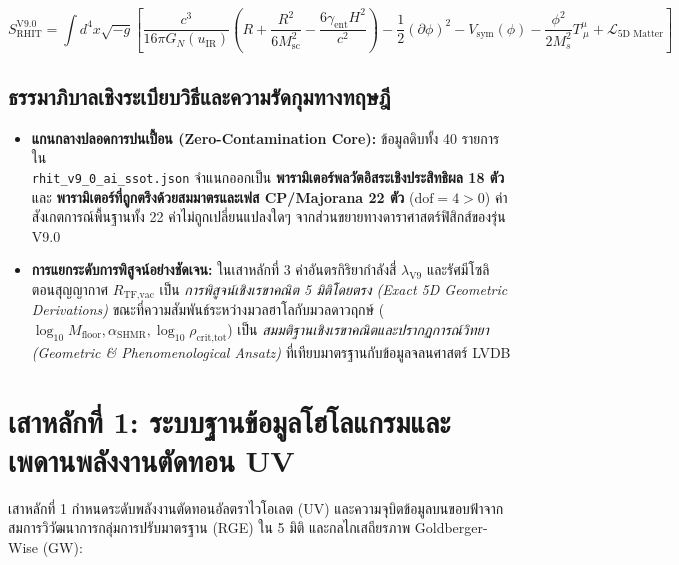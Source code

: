\documentclass[11pt, a4paper]{article}
\begin{document}
\begin{equation}
S_{\text{RHIT}}^{\text{V9.0}} = \int d^4x \sqrt{-g} \left[ \frac{c^3}{16\pi G_N(u_{\text{IR}})} \left( R + \frac{R^2}{6 M_{\text{sc}}^2} - \frac{6\gamma_{\text{ent}} H^2}{c^2} \right) - \frac{1}{2}(\partial\phi)^2 - V_{\text{sym}}(\phi) - \frac{\phi^2}{2M_s^2} T^\mu_{\ \mu} + \mathcal{L}_{5\text{D Matter}} \right]
\end{equation}

\subsection{ธรรมาภิบาลเชิงระเบียบวิธีและความรัดกุมทางทฤษฎี}

\begin{itemize}
    \item \textbf{แกนกลางปลอดการปนเปื้อน (Zero-Contamination Core):} ข้อมูลดิบทั้ง 40 รายการใน\\ \texttt{rhit\_v9\_0\_ai\_ssot.json} จำแนกออกเป็น \textbf{พารามิเตอร์พลวัตอิสระเชิงประสิทธิผล 18 ตัว} และ \textbf{พารามิเตอร์ที่ถูกตรึงด้วยสมมาตรและเฟส CP/Majorana 22 ตัว} ($\text{dof} = 4 > 0$) ค่าสังเกตการณ์พื้นฐานทั้ง 22 ค่าไม่ถูกเปลี่ยนแปลงใดๆ จากส่วนขยายทางดาราศาสตร์ฟิสิกส์ของรุ่น V9.0
    \item \textbf{การแยกระดับการพิสูจน์อย่างชัดเจน:} ในเสาหลักที่ 3 ค่าอันตรกิริยากำลังสี่ $\lambda_{\text{V9}}$ และรัศมีโซลิตอนสุญญากาศ $R_{\text{TF,vac}}$ เป็น \emph{การพิสูจน์เชิงเรขาคณิต 5 มิติโดยตรง (Exact 5D Geometric Derivations)} ขณะที่ความสัมพันธ์ระหว่างมวลฮาโลกับมวลดาวฤกษ์ ($\log_{10} M_{\text{floor}}, \alpha_{\text{SHMR}}, \log_{10} \rho_{\text{crit,tot}}$) เป็น \emph{สมมติฐานเชิงเรขาคณิตและปรากฏการณ์วิทยา (Geometric \& Phenomenological Ansatz)} ที่เทียบมาตรฐานกับข้อมูลจลนศาสตร์ LVDB
\end{itemize}

\section{เสาหลักที่ 1: ระบบฐานข้อมูลโฮโลแกรมและเพดานพลังงานตัดทอน UV}

เสาหลักที่ 1 กำหนดระดับพลังงานตัดทอนอัลตราไวโอเลต (UV) และความจุบิตข้อมูลบนขอบฟ้าจากสมการวิวัฒนาการกลุ่มการปรับมาตรฐาน (RGE) ใน 5 มิติ และกลไกเสถียรภาพ Goldberger-Wise (GW):
\end{document}
